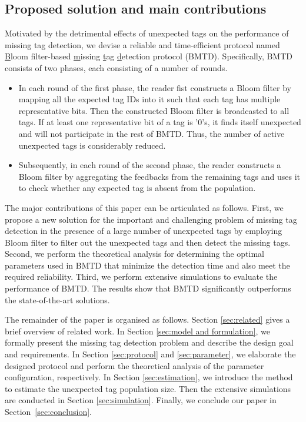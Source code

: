 \documentclass[10pt, twocolumn]{IEEEtran}
\begin{document}
\subsection{Proposed solution and main contributions}
Motivated by the detrimental effects of unexpected tags on the performance of missing tag detection, we devise a reliable and time-efficient protocol named \underline{B}loom filter-based \underline{m}issing \underline{t}ag \underline{d}etection protocol (BMTD). Specifically, BMTD consists of two phases, each consisting of a number of rounds.
\begin{itemize}
\item In each round of the first phase, the reader fist constructs a Bloom filter by mapping all the expected tag IDs into it such that each tag has multiple representative bits. Then the constructed Bloom filter is broadcasted to all tags. If at least one representative bit of a tag is '0's, it finds itself unexpected and will not participate in the rest of BMTD. Thus, the number of active unexpected tags is considerably reduced.
\item Subsequently, in each round of the second phase, the reader constructs a Bloom filter by aggregating the feedbacks from the remaining tags and uses it to check whether any expected tag is absent from the population.
\end{itemize}

The major contributions of this paper can be articulated as follows.
First, we propose a new solution for the important and challenging problem of missing tag detection in the presence of a large number of unexpected tags by employing Bloom filter to filter out the unexpected tags and then detect the missing tags.
Second, we perform the theoretical analysis for determining the optimal parameters used in BMTD that minimize the detection time and also meet the required reliability.
Third, we perform extensive simulations to evaluate the performance of BMTD. The results show that BMTD significantly outperforms the state-of-the-art solutions.

The remainder of the paper is organised as follows.
Section \ref{sec:related} gives a brief overview of related work.
In Section \ref{sec:model and formulation}, we formally present the missing tag detection problem and describe the design goal and requirements.
In Section \ref{sec:protocol} and \ref{sec:parameter}, we elaborate the designed protocol and perform the theoretical analysis of the parameter configuration, respectively.
In Section \ref{sec:estimation}, we introduce the method to estimate the unexpected tag population size.
Then the extensive simulations are conducted in
Section \ref{sec:simulation}.
Finally, we conclude our paper in Section~\ref{sec:conclusion}.
\end{document}
